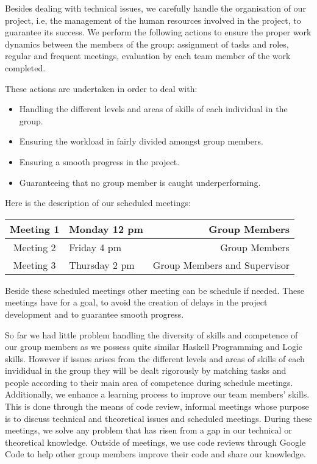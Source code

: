 Besides dealing with technical issues, we carefully handle the organisation of our project, i.e, the management of the human resources involved in the project, to guarantee its success. We perform the following actions to ensure the proper work dynamics between the members of the group: assignment of tasks and roles, regular and frequent meetings, evaluation by each team member of the work completed.

These actions are undertaken in order to deal with:

\begin{itemize}
\item Handling the different levels and areas of skills of each individual in the group.
\item Ensuring the workload in fairly divided amongst group members.
\item Ensuring a smooth progress in the project.
\item Guaranteeing that no group member is caught underperforming.
\end{itemize}

Here is the description of our scheduled meetings:

\begin{center}
\begin{tabular}{| c | l |  r |}
\hline
Meeting 1 & Monday 12 pm & Group Members \\ \hline
Meeting 2 & Friday 4 pm & Group Members \\ \hline
Meeting 3 & Thursday 2 pm & Group Members and Supervisor \\  
\hline
\end{tabular}
\end{center}

Beside these scheduled meetings other meeting can be schedule if needed. These meetings have for a goal, to avoid the creation of delays in the project development and to guarantee smooth progress.

So far we had little problem handling the diversity of skills and competence of our group members as we possess quite similar Haskell Programming and Logic skills. However if issues arises from the different levels and areas of skills of each invididual in the group they will be dealt rigorously by matching tasks and people according to their main area of competence during schedule meetings. Additionally, we enhance a learning process to improve our team members' skills. This is done through the means of code review, informal meetings whose purpose is to discuss technical and theoretical issues and scheduled meetings. During these meetings, we solve any problem that has risen from a gap in our technical or theoretical knowledge. Outside of meetings, we use code reviews through Google Code to help other group members improve their code and share our knowledge. 


